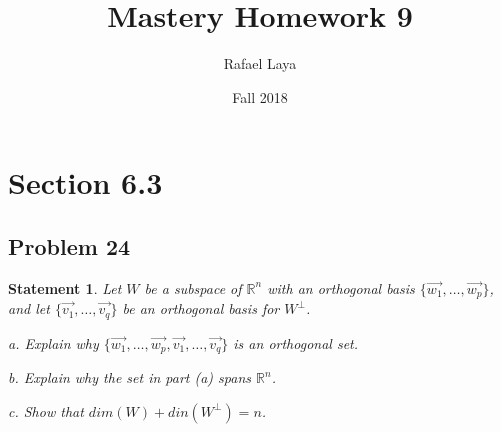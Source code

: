 \documentclass[12pt, letterpaper]{article}
\title{Mastery Homework 9}
\author{Rafael Laya}
\date{Fall 2018}
\newcommand{\R}{\mathbb{R}}
\theoremstyle{statement}
\theoremstyle{statement}
\newtheorem*{atmStat}{Statement}
\begin{document}
    \maketitle

    \section*{Section 6.3}
    \subsection*{Problem 24}
    \begin{atmStat}
    Let $W$ be a subspace of $\R^n$ with an orthogonal basis $\{\Vec{w_1}, \dots, \Vec{w_p}\}$, and let $\{\Vec{v_1}, \dots, \Vec{v_q}\}$ be an orthogonal basis for $W^\perp$. 
    
    a. Explain why $\{\Vec{w_1},\dots,\Vec{w_p},\Vec{v_1},\dots,\Vec{v_q}\}$ is an orthogonal set. 
    
    b. Explain why the set in part (a) spans $\R^n$.
    
    c. Show that $dim(W)+din(W^\perp)=n$.
    \end{atmStat}
\end{document}
